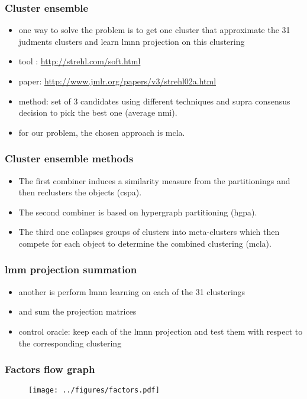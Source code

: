 \documentclass{beamer}
\begin{document}
\begin{frame}\frametitle{Cluster ensemble}
\begin{itemize}
  \item one way to solve the problem is to get one cluster that approximate the 31 judments clusters and learn lmnn projection on this clustering
  \item tool : \url{http://strehl.com/soft.html}
  \item paper: \url{http://www.jmlr.org/papers/v3/strehl02a.html}
  \item method: set of 3 candidates using different techniques and supra consensus decision to pick the best one (average nmi).
  \item for our problem, the chosen approach is mcla.
\end{itemize}
\end{frame}


\begin{frame}\frametitle{Cluster ensemble methods}
\begin{itemize}
  \item The first combiner induces a similarity measure from the partitionings and then reclusters the objects (cspa).
  \item The second combiner is based on hypergraph partitioning (hgpa).
  \item The third one collapses groups of clusters into meta-clusters which then compete for each object to determine the combined clustering (mcla).
\end{itemize}
\end{frame}


\begin{frame}\frametitle{lmm projection summation}
\begin{itemize}
  \item another is perform lmnn learning on each of the 31 clusterings
  \item and sum the projection matrices
  \item control oracle: keep each of the lmnn projection and test them with respect to the corresponding clustering
\end{itemize}
\end{frame}



\begin{frame}\frametitle{Factors flow graph}
\begin{center}
\begin{figure}
\texttt{[image: ../figures/factors.pdf]}
\label{factorFlowGraph}
\end{figure}
\end{center}
\end{frame}
\end{document}
